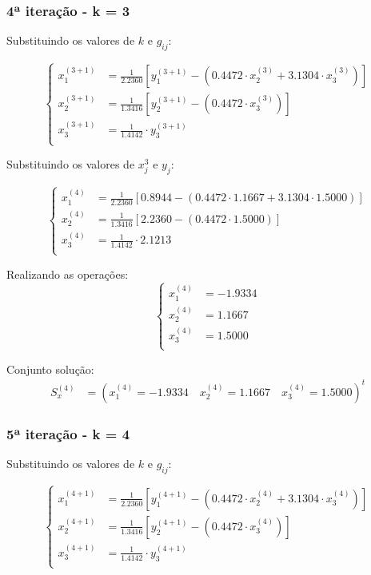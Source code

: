 \documentclass[12pt,a4paper]{article}
\begin{document}
\subsubsection{4ª iteração - k = 3}

Substituindo os valores de $k$ e $g_{ij}$:

\[
\left\{
\begin{aligned}
x_1^{(3+1)} &= \frac{1}{2.2360} \left[ y_1^{(3+1)} - \left(0.4472 \cdot x_2^{(3)} + 3.1304 \cdot x_3^{(3)}\right) \right] \\
x_2^{(3+1)} &= \frac{1}{1.3416} \left[ y_2^{(3+1)} - \left(0.4472 \cdot x_3^{(3)}\right) \right] \\
x_3^{(3+1)} &= \frac{1}{1.4142} \cdot y_3^{(3+1)} \\
\end{aligned}
\right.
\]

Substituindo os valores de $x_j^{3}$ e $y_j$:

\[
\left\{
\begin{aligned}
x_1^{(4)} &= \frac{1}{2.2360} \left[ 0.8944 - \left(0.4472 \cdot 1.1667 + 3.1304 \cdot 1.5000\right) \right] \\
x_2^{(4)} &= \frac{1}{1.3416} \left[ 2.2360 - \left(0.4472 \cdot 1.5000\right) \right] \\
x_3^{(4)} &= \frac{1}{1.4142} \cdot 2.1213 \\
\end{aligned}
\right.
\]

Realizando as operações:
\[
\left\{
\begin{aligned}
x_1^{(4)} &= - 1.9334 \\
x_2^{(4)} &= 1.1667 \\
x_3^{(4)} &= 1.5000 \\
\end{aligned}
\right.
\]

Conjunto solução:
\begin{align*}
S_x^{(4)} &= ( x_1^{(4)} = - 1.9334 \quad x_2^{(4)} = 1.1667 \quad x_3^{(4)} = 1.5000 )^{t}
\end{align*}

\subsubsection{5ª iteração - k = 4}

Substituindo os valores de $k$ e $g_{ij}$:

\[
\left\{
\begin{aligned}
x_1^{(4+1)} &= \frac{1}{2.2360} \left[ y_1^{(4+1)} - \left(0.4472 \cdot x_2^{(4)} + 3.1304 \cdot x_3^{(4)}\right) \right] \\
x_2^{(4+1)} &= \frac{1}{1.3416} \left[ y_2^{(4+1)} - \left(0.4472 \cdot x_3^{(4)}\right) \right] \\
x_3^{(4+1)} &= \frac{1}{1.4142} \cdot y_3^{(4+1)} \\
\end{aligned}
\right.
\]
\end{document}
